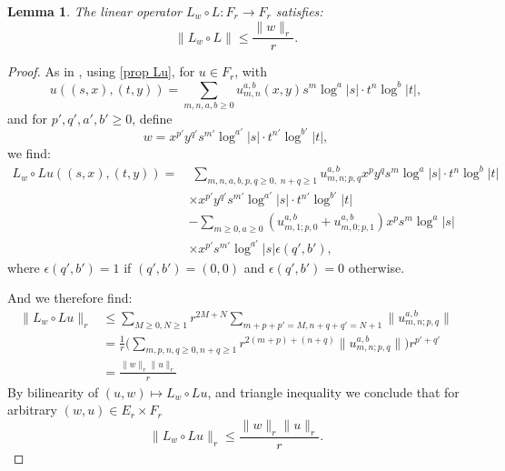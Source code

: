\documentclass[12pt]{article}
\newtheorem{lem}[thm]{Lemma}
\begin{document}
    \begin{lem}\label{control Lw o L}
        The linear operator $L_w\circ L : F_r\to F_r$ satisfies: $$\|L_w\circ L\|\leqslant \frac{\|w\|_r}{r}.$$
    \end{lem}
    \begin{proof}
        As in \cite{bt}, using \eqref{prop Lu}, for $u\in F_r$, with
        $$ u\left((s,x),(t,y)\right) = \sum_{m,n,a,b\geqslant 0} u_{m,n}^{a,b}(x,y)s^m\log^a|s|\cdot t^n\log^b|t|,$$
        and for $p',q',a',b'\geqslant0$, define
        $$w = x^{p'}y^{q'} s^{m'}\log^{a'}|s|\cdot t^{n'}\log^{b'}|t|,$$
        we find:
        \begin{align*}
            L_w\circ L u\left((s,x),(t,y)\right) =&\;\sum_{m,n,a,b,p,q\geqslant 0,\; n+q\geqslant1} u_{m,n;p,q}^{a,b} x^py^qs^m\log^a|s|\cdot
             t^n\log^b|t|\\&\times x^{p'}y^{q'} s^{m'}\log^{a'}|s|\cdot t^{n'}\log^{b'}|t|\\
            &- \sum_{m\geqslant 0,a \geqslant 0}(u_{m,1;p,0}^{a,b}+u_{m,0;p,1}^{a,b})x^ps^m\log^a|s|\\
            &\times x^{p'} s^{m'}\log^{a'}|s|\epsilon(q',b'),
        \end{align*}
       where $\epsilon(q',b') = 1$ if $(q',b') = (0,0)$ and $\epsilon(q',b') = 0$ otherwise.
       
        And we therefore find: 
        \begin{align*}
            \|L_w \circ L u\|_r &\leqslant \sum_{M\geqslant 0, N\geqslant 1} r^{2M+N}\sum_{m+p+p' = M , n+q+q'=N+1} \| u_{m,n;p,q}^{a,b}\|\\
            &=\frac{1}{r} \Big( \sum_{m,p,n,q\geqslant 0, n+q\geqslant 1} r^{2(m+p)+(n+q)} \| u_{m,n;p,q}^{a,b} \| \Big)r^{p'+q'}\\
            &= \frac{\|w\|_r\|u\|_r}{r} 
        \end{align*}
        By bilinearity of $ (u,w)\mapsto L_w\circ L u $, and triangle inequality we conclude that for arbitrary $(w,u)\in E_r\times F_r$
        $$\|L_w\circ L u\|_r \leqslant \frac{\|w\|_r\|u\|_r}{r}.$$
    \end{proof}
    
\end{document}
